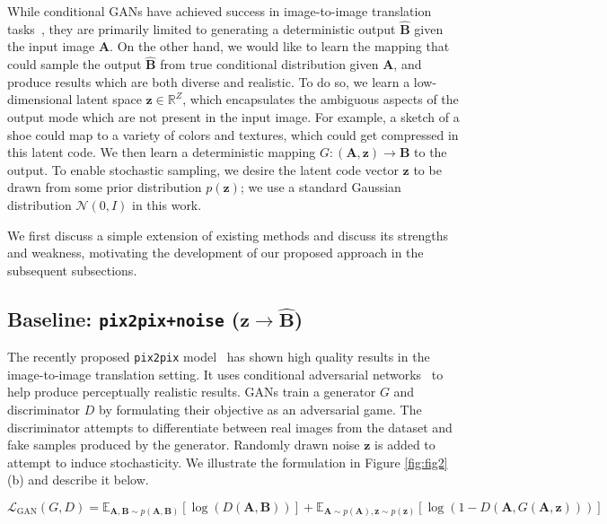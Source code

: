 While conditional GANs have achieved success in image-to-image translation tasks~\citep{pathakCVPR16context,sangkloy2017scribbler,xian2017texturegan,yang2016high,isola2016image,zhu2017unpaired}, they are primarily limited to generating a deterministic output $\widehat{\mathbf{B}}$ given the input image $\mathbf{A}$. 
On the other hand, we would like to learn the mapping that could sample the output $\widehat{\mathbf{B}}$ from true conditional distribution given $\mathbf{A}$, and produce results which are both diverse and realistic. To do so, we learn a low-dimensional latent space $\mathbf{z} \in \mathds{R}^{Z}$, which encapsulates the ambiguous aspects of the output mode which are not present in the input image. For example, a sketch of a shoe could map to a variety of colors and textures, which could get compressed in this latent code. We then learn a deterministic mapping $G:(\mathbf{A},\mathbf{z})\rightarrow \mathbf{B}$ to the output. To enable stochastic sampling, we desire the latent code vector $\mathbf{z}$ to be drawn from some prior distribution $p(\mathbf{z})$; we use a standard Gaussian distribution $\mathcal{N}(0,I)$ in this work.

We first discuss a simple extension of existing methods and discuss its strengths and weakness, motivating the development of our proposed approach in the subsequent subsections.

\subsection{Baseline: \texttt{pix2pix+noise} ($\mathbf{z} \rightarrow \widehat{\mathbf{B}}$)}
The recently proposed \texttt{pix2pix} model~\citep{isola2016image} has shown high quality results in the image-to-image translation setting. It uses conditional adversarial networks~\citep{goodfellow2014generative,mirza2014conditional} to help produce perceptually realistic results. GANs train a generator $G$ and discriminator $D$ by formulating their objective as an adversarial game. The discriminator attempts to differentiate between real images from the dataset and fake samples produced by the generator. Randomly drawn noise $\mathbf{z}$ is added to attempt to induce stochasticity. We illustrate the formulation in Figure \ref{fig:fig2}(b) and describe it below.

\begin{equation}
\mathcal{L}_{\text{GAN}}(G,D) = \mathds{E}_{\mathbf{A},\mathbf{B}\sim p(\mathbf{A},\mathbf{B})}[\log(D(\mathbf{A},\mathbf{B}))] + \mathds{E}_{\mathbf{A}\sim p(\mathbf{A}),\mathbf{z}\sim p(\mathbf{z})}[ \log(1-D(\mathbf{A},G(\mathbf{A},\mathbf{z})))]
\label{eqn:Lgan}
\end{equation}


